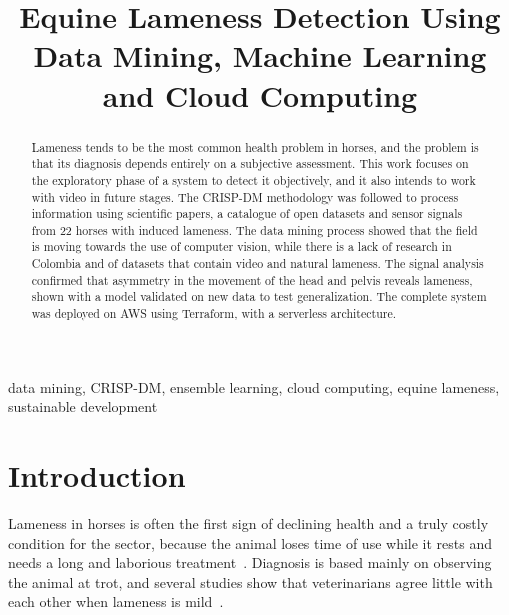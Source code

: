 \documentclass[conference,a4paper]{IEEEtran}
\begin{document}
\title{Equine Lameness Detection Using Data Mining, Machine Learning and Cloud Computing}

\author{
}

\maketitle

\begin{abstract}
Lameness tends to be the most common health problem in horses, and the problem is that its diagnosis depends entirely on a subjective assessment. This work focuses on the exploratory phase of a system to detect it objectively, and it also intends to work with video in future stages. The CRISP-DM methodology was followed to process information using scientific papers, a catalogue of open datasets and sensor signals from 22 horses with induced lameness. The data mining process showed that the field is moving towards the use of computer vision, while there is a lack of research in Colombia and of datasets that contain video and natural lameness. The signal analysis confirmed that asymmetry in the movement of the head and pelvis reveals lameness, shown with a model validated on new data to test generalization. The complete system was deployed on AWS using Terraform, with a serverless architecture.
\end{abstract}

\begin{IEEEkeywords}
data mining, CRISP-DM, ensemble learning, cloud computing, equine lameness, sustainable development
\end{IEEEkeywords}

\section{Introduction}

Lameness in horses is often the first sign of declining health and a truly costly condition for the sector, because the animal loses time of use while it rests and needs a long and laborious treatment~\cite{nehs2013,usda1998}. Diagnosis is based mainly on observing the animal at trot, and several studies show that veterinarians agree little with each other when lameness is mild~\cite{keegan2010,hammarberg2016}.
\end{document}
